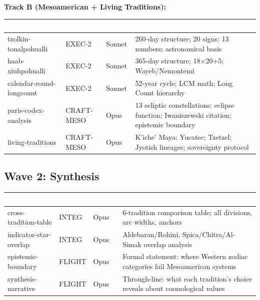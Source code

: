 \documentclass[11pt,letterpaper]{article}
\newcommand{\tableheader}[1]{\textbf{\sffamily\textcolor{white}{#1}}}
\begin{document}
\textbf{Track B (Mesoamerican + Living Traditions):}

\begin{center}
\begin{tabularx}{\textwidth}{L{3cm}L{2cm}L{2cm}X}
\toprule
{}
\tableheader{Task} & \tableheader{Agent} & \tableheader{Model} & \tableheader{Spec} \\
\midrule
tzolkin-tonalpohualli & EXEC-2 & Sonnet & 260-day structure; 20 signs; 13 numbers; astronomical basis \\
haab-xiuhpohualli & EXEC-2 & Sonnet & 365-day structure; 18×20+5; Wayeb/Nemontemi \\
calendar-round-longcount & EXEC-2 & Sonnet & 52-year cycle; LCM math; Long Count hierarchy \\
paris-codex-analysis & CRAFT-MESO & Opus & 13 ecliptic constellations; eclipse function; Iwaniszewski citation; epistemic boundary \\
living-traditions & CRAFT-MESO & Opus & K'iche' Maya; Yucatec; Tzetzel; Jyotish lineages; sovereignty protocol \\
\bottomrule
\end{tabularx}
\end{center}

\subsection{Wave 2: Synthesis}

\begin{center}
\begin{tabularx}{\textwidth}{L{3cm}L{2cm}L{2cm}X}
\toprule
{}
\tableheader{Task} & \tableheader{Agent} & \tableheader{Model} & \tableheader{Spec} \\
\midrule
cross-tradition-table & INTEG & Opus & 6-tradition comparison table; all divisions, arc widths, anchors \\
indicator-star-overlap & INTEG & Opus & Aldebaran/Rohini, Spica/Chitra/Al-Simak overlap analysis \\
epistemic-boundary & FLIGHT & Opus & Formal statement: where Western zodiac categories fail Mesoamerican systems \\
synthesis-narrative & FLIGHT & Opus & Through-line: what each tradition's choice reveals about cosmological values \\
\bottomrule
\end{tabularx}
\end{center}
\end{document}
